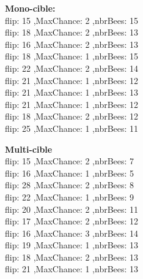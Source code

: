 \noindent
\begin{minipage}[t]{0.5\textwidth}
	\textbf{Mono-cible:} \\
	flip: 15 ,MaxChance: 2 ,nbrBees: 15\\
	flip: 18 ,MaxChance: 2 ,nbrBees: 13\\
	flip: 16 ,MaxChance: 2 ,nbrBees: 13\\
	flip: 18 ,MaxChance: 1 ,nbrBees: 15\\
	flip: 22 ,MaxChance: 2 ,nbrBees: 14\\
	flip: 21 ,MaxChance: 1 ,nbrBees: 12\\
	flip: 21 ,MaxChance: 1 ,nbrBees: 13\\
	flip: 21 ,MaxChance: 1 ,nbrBees: 12\\
	flip: 18 ,MaxChance: 2 ,nbrBees: 12\\
	flip: 25 ,MaxChance: 1 ,nbrBees: 11\\
\end{minipage}\hfill
\hspace{0.5cm}
\begin{minipage}[t]{0.5\textwidth}
	\textbf{Multi-cible}\\
	flip: 15 ,MaxChance: 2 ,nbrBees: 7\\
	flip: 16 ,MaxChance: 1 ,nbrBees: 5\\
	flip: 28 ,MaxChance: 2 ,nbrBees: 8\\
	flip: 22 ,MaxChance: 1 ,nbrBees: 9\\
	flip: 20 ,MaxChance: 2 ,nbrBees: 11\\
	flip: 17 ,MaxChance: 2 ,nbrBees: 12\\
	flip: 16 ,MaxChance: 3 ,nbrBees: 14\\
	flip: 19 ,MaxChance: 1 ,nbrBees: 13\\
	flip: 18 ,MaxChance: 2 ,nbrBees: 13\\
	flip: 21 ,MaxChance: 1 ,nbrBees: 13\\
\end{minipage}\hfill




